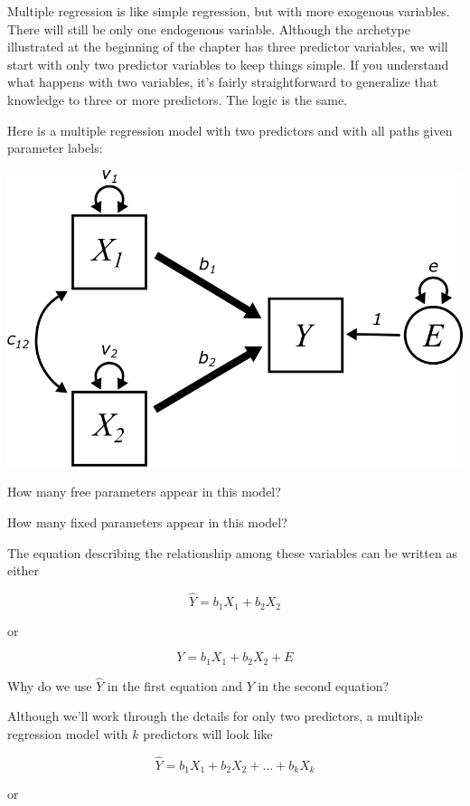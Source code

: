 \documentclass[
]{book}
\begin{document}
Multiple regression is like simple regression, but with more exogenous variables. There will still be only one endogenous variable. Although the archetype illustrated at the beginning of the chapter has three predictor variables, we will start with only two predictor variables to keep things simple. If you understand what happens with two variables, it's fairly straightforward to generalize that knowledge to three or more predictors. The logic is the same.

Here is a multiple regression model with two predictors and with all paths given parameter labels:

\begin{center}\includegraphics{graphics/multiple_regression_2} \end{center}

How many free parameters appear in this model?

How many fixed parameters appear in this model?

The equation describing the relationship among these variables can be written as either

\[
\hat{Y} = b_{1}X_{1} + b_{2}X_{2}
\]

or

\[
Y = b_{1}X_{1} + b_{2}X_{2} + E
\]

Why do we use \(\hat{Y}\) in the first equation and \(Y\) in the second equation?

Although we'll work through the details for only two predictors, a multiple regression model with \(k\) predictors will look like

\[
\hat{Y} = b_{1}X_{1} + b_{2}X_{2} + \dots + b_{k}X_{k}
\]

or
\end{document}
